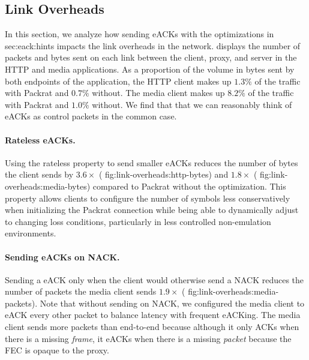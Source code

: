 \subsection{Link Overheads}


In this section, we analyze how sending eACKs with the optimizations in \Cref
{sec:eack:hints} impacts the link overheads in the network.
 displays the number of packets and bytes sent on each
link between the client, proxy, and server in the HTTP and media applications.
As a proportion of the volume in bytes sent by both endpoints of the
application, the HTTP client makes up $1.3\%$ of the traffic with Packrat and
$0.7\%$ without. The media client makes up $8.2\%$ of the traffic with Packrat
and $1.0\%$ without. We find that that we can reasonably think of eACKs as
control packets in the common case.

\paragraph{Rateless eACKs.}
Using the rateless property to send smaller eACKs
reduces the number of bytes the client sends by $3.6\!\times$ (\Cref
{fig:link-overheads:http-bytes}) and $1.8\!\times$ (\Cref
{fig:link-overheads:media-bytes}) compared to Packrat without the optimization.
This property allows clients to configure the number of symbols less
conservatively when initializing the Packrat connection while being able to
dynamically adjust to changing loss conditions, particularly in less controlled
non-emulation environments.

\paragraph{Sending eACKs on NACK.}

Sending a eACK only when the client would otherwise send a NACK reduces the
number of packets the media client sends $1.9\!\times$ (\Cref
{fig:link-overheads:media-packets}). Note that without sending on NACK, we
configured the media client to eACK every other packet to balance latency with
frequent eACKing. The media client sends more packets than end-to-end because
although it only ACKs when there is a missing \textit{frame}, it eACKs when
there is a missing \textit{packet} because the FEC is opaque to the proxy.

